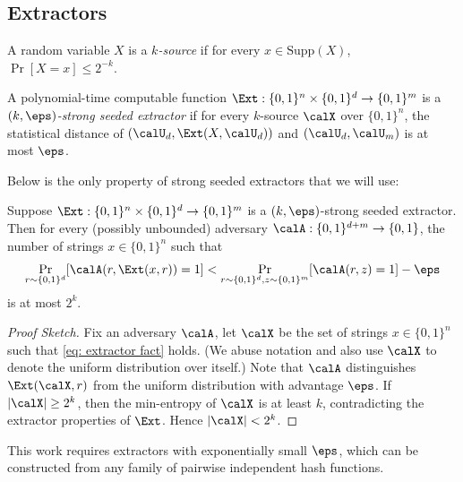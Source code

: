 \subsection{Extractors}
\begin{definition}[$k$-Source]
    A random variable $X$ is a \emph{$k$-source} if for every $x\in \mathrm{Supp}(X)$, $\Pr[X = x] \le 2^{-k}$.
\end{definition}

\begin{definition}\label{def: comp-ext}	
    A polynomial-time computable function $\Ext: \{0, 1\}^n \times \{0, 1\}^d \to \{0, 1\}^m$ is a \emph{$(k, \eps)$-strong seeded extractor} if for every $k$-source $\calX$ over $\{0, 1\}^n$, the statistical distance of $(\calU_d, \Ext(X, \calU_d))$ and $(\calU_d, \calU_m)$ is at most $\eps$.
\end{definition}

Below is the only property of strong seeded extractors that we will use:

\begin{fact}
    Suppose $\Ext: \{0, 1\}^n \times \{0, 1\}^d \to \{0, 1\}^m$ is a $(k, \eps)$-strong seeded extractor. Then for every (possibly unbounded) adversary $\calA: \{0, 1\}^{d+m} \to \{0, 1\}$, the number of strings $x\in \{0, 1\}^n$ such that
	\begin{equation}\label{eq: extractor fact}
        \Pr_{r\sim \{0, 1\}^d}[\calA(r, \Ext(x, r)) = 1] < \Pr_{r\sim \{0, 1\}^d, z\sim \{0, 1\}^m}[\calA(r, z) = 1] - \eps
    \end{equation}
	is at most $2^k$.
\end{fact}
\begin{proof}[Proof Sketch]
	Fix an adversary $\calA$, let $\calX$ be the set of strings $x \in \{0, 1\}^n$ such that \eqref{eq: extractor fact} holds. (We abuse notation and also use $\calX$ to denote the uniform distribution over itself.) Note that $\calA$ distinguishes $\Ext(\calX, r)$ from the uniform distribution with advantage $\eps$. If $|\calX| \ge 2^k$, then the min-entropy of $\calX$ is at least $k$, contradicting the extractor properties of $\Ext$. Hence $|\calX| < 2^k$.
\end{proof}

This work requires extractors with exponentially small $\eps$, which can be constructed from any family of pairwise independent hash functions.

